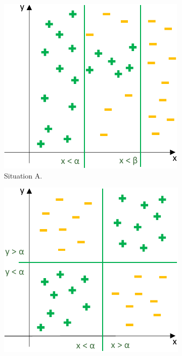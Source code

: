 \begin{figure}
    \centering
    \begin{subfigure}[b]{0.5\textwidth}
        \centering
        \includegraphics[width=\textwidth]{figures/ties_A.pdf}
        \caption{Situation A.}\label{fig:tiesA}
    \end{subfigure}%
    \begin{subfigure}[b]{0.5\textwidth}
        \centering
        \includegraphics[width=\textwidth]{figures/ties_B.pdf}

\end{subfigure}
\end{figure}
